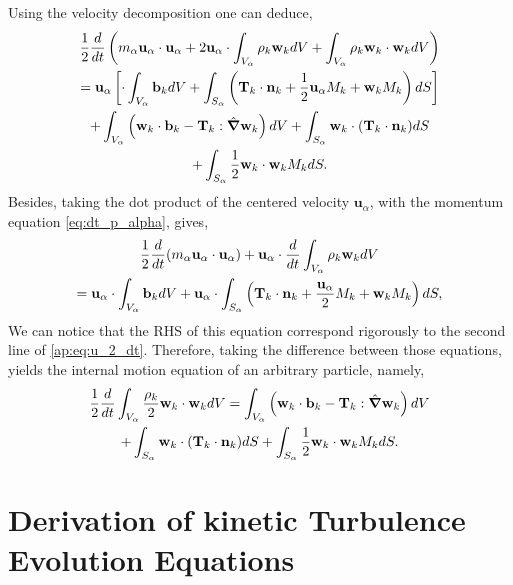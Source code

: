 Using the velocity decomposition one can deduce, 
\begin{multline}
    \frac{1}{2} \frac{d}{d t} \left(
        m_\alpha \textbf{u}_\alpha \cdot \textbf{u}_\alpha
        + 2\textbf{u}_\alpha \cdot \int_{V_\alpha}  \rho_k \textbf{w}_k dV
        + \int_{V_\alpha} \rho_k \textbf{w}_k \cdot \textbf{w}_k dV
    \right)\\
    =  \textbf{u}_\alpha \left[
        \cdot\int_{V_\alpha} \textbf{b}_k dV
        +  \int_{S_\alpha} \left(
            \textbf{T}_k \cdot \textbf{n}_k
            + \frac{1}{2} \textbf{u}_\alpha M_k 
            + \textbf{w}_k M_k 
        \right)dS
    \right]\\
    + \int_{V_\alpha} \left(
        \textbf{w}_k\cdot\textbf{b}_k
        -\textbf{T}_k : \hat{\bm{\nabla}} \textbf{w}_k
    \right)dV
    + \int_{S_\alpha} 
        \textbf{w}_k\cdot(\textbf{T}_k\cdot \textbf{n}_k)
    dS\\
    + \int_{S_\alpha} \frac{1}{2} \textbf{w}_k \cdot \textbf{w}_k M_k dS.
    \label{ap:eq:u_2_dt}
\end{multline}
Besides, taking the dot product of the centered velocity $\textbf{u}_\alpha$, with the momentum equation \ref{eq:dt_p_alpha}, gives, 
\begin{multline*}
    \frac{1}{2}\frac{d}{d t} (m_\alpha \textbf{u}_\alpha \cdot \textbf{u}_\alpha)
    + \textbf{u}_\alpha \cdot \frac{d}{d t} \int_{V_\alpha} \rho_k \textbf{w}_k dV \\
    = \textbf{u}_\alpha \cdot \int_{V_\alpha} \textbf{b}_k dV
    + \textbf{u}_\alpha \cdot \int_{S_\alpha} \left(
    \textbf{T}_k \cdot\textbf{n}_k
    +\frac{\textbf{u}_\alpha}{2} M_k
    +\textbf{w}_k M_k
    \right)dS,
\end{multline*}
We can notice that the RHS of this equation correspond rigorously to the second line of \ref{ap:eq:u_2_dt}.
Therefore, taking the difference between those equations, yields the internal motion equation of an arbitrary particle, namely, 
\begin{multline*}
    \frac{1}{2}\frac{d}{d t} \int_{V_\alpha} \frac{\rho_k}{2} \textbf{w}_k \cdot \textbf{w}_k dV
    = \int_{V_\alpha} \left(
        \textbf{w}_k\cdot\textbf{b}_k
        -\textbf{T}_k : \hat{\bm{\nabla}} \textbf{w}_k
    \right)dV\\
    + \int_{S_\alpha} 
        \textbf{w}_k\cdot(\textbf{T}_k\cdot \textbf{n}_k)
    dS
    + \int_{S_\alpha} \frac{1}{2} \textbf{w}_k \cdot \textbf{w}_k M_k dS.
\end{multline*}

\section{Derivation of kinetic Turbulence Evolution Equations}

